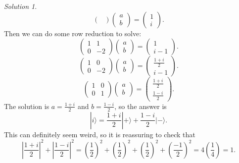 \documentclass{article}
\theoremstyle{plain}
\theoremstyle{definition}
\theoremstyle{remark}
\newtheorem*{solution}{Solution}
\numberwithin{theorem}{section}
\begin{document}
\begin{solution}
\[\begin{pmatrix}
			\end{pmatrix}
			\begin{pmatrix}
				a \\ b 
			\end{pmatrix}
			=
			\begin{pmatrix}
				1 \\
				i
			\end{pmatrix}.
		\]
		Then we can do some row reduction to solve:
		\[
			\begin{pmatrix}
				1 & 1 \\
				0 & -2
			\end{pmatrix}
			\begin{pmatrix}
				a \\ b 
			\end{pmatrix}
			=
			\begin{pmatrix}
				1 \\
				i-1
			\end{pmatrix}.
		\]
		\[
			\begin{pmatrix}
				1 & 0 \\
				0 & -2
			\end{pmatrix}
			\begin{pmatrix}
				a \\ b 
			\end{pmatrix}
			=
			\begin{pmatrix}
				\frac{1+i}{2} \\
				i-1
			\end{pmatrix}.
		\]
		\[
			\begin{pmatrix}
				1 & 0 \\
				0 & 1
			\end{pmatrix}
			\begin{pmatrix}
				a \\ b 
			\end{pmatrix}
			=
			\begin{pmatrix}
				\frac{1+i}{2} \\
				\frac{1-i}{2}
			\end{pmatrix}.
		\]
		The solution is $a = \frac{1+i}{2}$ and $b = \frac{1-i}{2}$, so the answer is
		\[
			|i\rangle = \frac{1+i}{2} |+ \rangle + \frac{1-i}{2} | - \rangle.
		\]
		This can definitely seem weird, so it is reassuring to check that 
		\[
			\left| \frac{1+i}{2} \right|^2 + \left| \frac{1-i}{2} \right|^2 =
			\left( \frac{1}{2} \right)^2 + \left( \frac{1}{2} \right)^2
			+ \left( \frac{1}{2} \right)^2 + \left( \frac{-1}{2} \right)^2 = 4 \left( \frac{1}{4} \right) = 1.
		\]


\end{solution}
\end{document}
